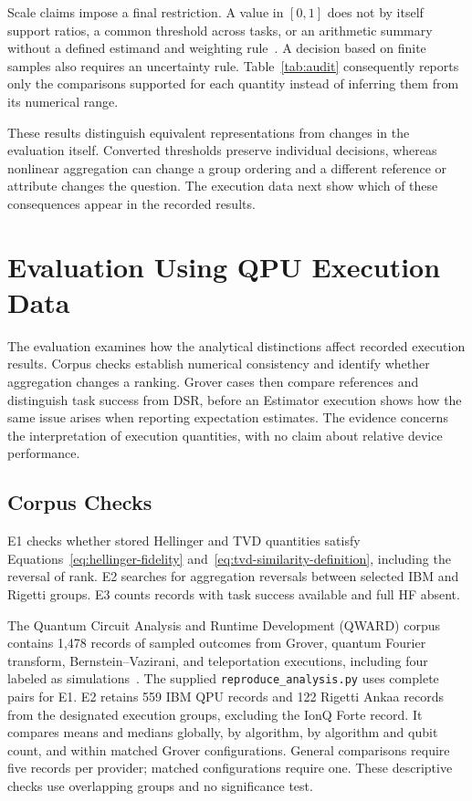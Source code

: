 \documentclass[10pt,conference]{IEEEtran}
\begin{document}
Scale claims impose a final restriction. A value in $[0,1]$ does not by itself support ratios, a common threshold across tasks, or an arithmetic summary without a defined estimand and weighting rule~\cite{fentonBieman2015,fenton1994}. A decision based on finite samples also requires an uncertainty rule. Table~\ref{tab:audit} consequently reports only the comparisons supported for each quantity instead of inferring them from its numerical range.

These results distinguish equivalent representations from changes in the evaluation itself. Converted thresholds preserve individual decisions, whereas nonlinear aggregation can change a group ordering and a different reference or attribute changes the question. The execution data next show which of these consequences appear in the recorded results.

\section{Evaluation Using QPU Execution Data}
\label{sec:evaluation}

The evaluation examines how the analytical distinctions affect recorded execution results. Corpus checks establish numerical consistency and identify whether aggregation changes a ranking. Grover cases then compare references and distinguish task success from DSR, before an Estimator execution shows how the same issue arises when reporting expectation estimates. The evidence concerns the interpretation of execution quantities, with no claim about relative device performance.

\subsection{Corpus Checks}
\label{sec:corpus-checks}

E1 checks whether stored Hellinger and TVD quantities satisfy Equations~\ref{eq:hellinger-fidelity} and~\ref{eq:tvd-similarity-definition}, including the reversal of rank. E2 searches for aggregation reversals between selected IBM and Rigetti groups. E3 counts records with task success available and full HF absent.

The Quantum Circuit Analysis and Runtime Development (QWARD) corpus contains 1,478 records of sampled outcomes from Grover, quantum Fourier transform, Bernstein--Vazirani, and teleportation executions, including four labeled as simulations~\cite{qwardGroverData2026}. The supplied \texttt{reproduce\_analysis.py} uses complete pairs for E1. E2 retains 559 IBM QPU records and 122 Rigetti Ankaa records from the designated execution groups, excluding the IonQ Forte record. It compares means and medians globally, by algorithm, by algorithm and qubit count, and within matched Grover configurations. General comparisons require five records per provider; matched configurations require one. These descriptive checks use overlapping groups and no significance test.
\end{document}
